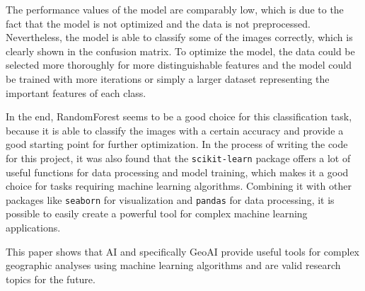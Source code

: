 \documentclass[oneside,twocolumn,10pt,cleanfoot,cleanhead]{asme2ej}
\begin{document}
The performance values of the model are comparably low, which is due to the fact that the model is not optimized and the data is not preprocessed.
Nevertheless, the model is able to classify some of the images correctly, which is clearly shown in the confusion matrix.
To optimize the model, the data could be selected more thoroughly for more distinguishable features and the model could be trained with more iterations or simply a larger dataset representing the important features of each class.

In the end, RandomForest seems to be a good choice for this classification task, because it is able to classify the images with a certain accuracy and provide a good starting point for further optimization.
In the process of writing the code for this project, it was also found that the \texttt{scikit-learn} package offers a lot of useful functions for data processing and model training, which makes it a good choice for tasks requiring machine learning algorithms.
Combining it with other packages like \texttt{seaborn} for visualization and \texttt{pandas} for data processing, it is possible to easily create a powerful tool for complex machine learning applications.

This paper shows that AI and specifically GeoAI provide useful tools for complex geographic analyses using machine learning algorithms and are valid research topics for the future.




\end{document}
